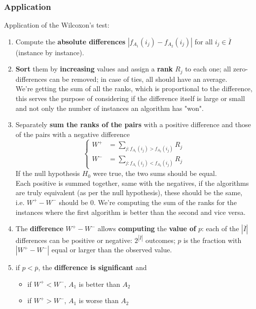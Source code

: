 \subsubsection{Application}
Application of the Wilcoxon's test: 
\begin{enumerate}
	\item Compute the \textbf{absolute differences} $| f_{A_1} (i_j) − f_{A_2} (i_j)|$ for all $i_j \in \overline{I}$ (instance by instance).\\
	
	\item \textbf{Sort} them by \textbf{increasing} values and assign a \textbf{rank} $R_j$ to each one; all zero-differences can be removed; in case of ties, all should have an average.\\
	We're getting the sum of all the ranks, which is proportional to the difference, this serves the purpose of considering if the difference itself is large or small and not only the number of instances an algorithm has "won".\\
	
	\item Separately \textbf{sum the ranks of the pairs} with a positive difference and those of the pairs with a negative difference
	$$ 
	\begin{cases}
		W^+ & = \sum_{j:f_{A_1} (i_j) > f_{A_2} (i_j)} R_j \\
		W^- & = \sum_{j:f_{A_1} (i_j) < f_{A_2} (i_j)} R_j
	\end{cases}
	$$
	If the null hypothesis $H_0$ were true, the two sums should be equal.\\
	Each positive is summed together, same with the negatives, if the algorithms are truly equivalent (as per the null hypothesis), these should be the same, i.e. $W^+ - W^-$ should be $0$. We're computing the sum of the ranks for the instances where the first algorithm is better than the second and vice versa.\\
	
	\item The \textbf{difference} $W^+ - W^-$ allows \textbf{computing} the \textbf{value of} $p$: each of the $|\overline{I}|$ differences can be positive or negative: $2^{|\overline{I}|}$ outcomes; $p$ is the fraction with $|W^+ - W^-|$ equal or larger than the observed value.\\
	
	\item if $p < \overline{p}$, the \textbf{difference is significant} and
	\begin{itemize}
		\item if $W^+ < W^-$, $A_1$ is better than $A_2$
		\item if $W^+ > W^-$, $A_1$ is worse than $A_2$
	\end{itemize}
\end{enumerate}

